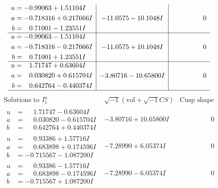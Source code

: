 \documentclass[1p]{elsarticle_modified}
\theoremstyle{definition}
\newcommand{\I}{\sqrt{-1}}
\begin{document}
$$\begin{array}{c|c|c}
\begin{aligned}
u &= -0.99063 + 1.51104 I \\
a &= -0.718316 + 0.217666 I \\
b &= \phantom{-}0.71001 - 1.23551 I\end{aligned}
 & -11.0575 - 10.1048 I & \phantom{-0.000000 } 0 \\ \hline\begin{aligned}
u &= -0.99063 - 1.51104 I \\
a &= -0.718316 - 0.217666 I \\
b &= \phantom{-}0.71001 + 1.23551 I\end{aligned}
 & -11.0575 + 10.1048 I & \phantom{-0.000000 } 0 \\ \hline\begin{aligned}
u &= \phantom{-}1.71747 + 0.63604 I \\
a &= \phantom{-}0.030820 + 0.615704 I \\
b &= \phantom{-}0.642764 - 0.440374 I\end{aligned}
 & -3.80716 - 10.65800 I & \phantom{-0.000000 } 0\\
 \hline 
 \end{array}$$\newpage$$\begin{array}{c|c|c}  
\text{Solutions to }I^u_{1}& \I (\text{vol} + \sqrt{-1}CS) & \text{Cusp shape}\\
 \hline 
\begin{aligned}
u &= \phantom{-}1.71747 - 0.63604 I \\
a &= \phantom{-}0.030820 - 0.615704 I \\
b &= \phantom{-}0.642764 + 0.440374 I\end{aligned}
 & -3.80716 + 10.65800 I & \phantom{-0.000000 } 0 \\ \hline\begin{aligned}
u &= \phantom{-}0.93386 + 1.57716 I \\
a &= \phantom{-}0.683898 + 0.174596 I \\
b &= -0.715567 - 1.087200 I\end{aligned}
 & -7.28990 + 6.05374 I & \phantom{-0.000000 } 0 \\ \hline\begin{aligned}
u &= \phantom{-}0.93386 - 1.57716 I \\
a &= \phantom{-}0.683898 - 0.174596 I \\
b &= -0.715567 + 1.087200 I\end{aligned}
 & -7.28990 - 6.05374 I & \phantom{-0.000000 } 0 \\ \hline\begin{aligned}

\end{aligned}
\end{array}$$
\end{document}
